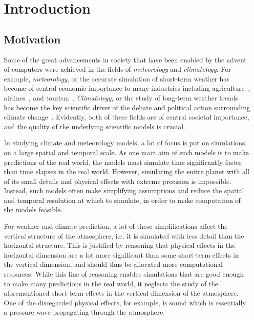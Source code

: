 
\chapter{Introduction}\label{chapter:introduction}
\section{Motivation}\label{sec:motivation}
Some of the great advancements in society that have been enabled by the advent of computers were achieved in the fields of \emph{meteorology} and \emph{climatology}.
For example, \emph{meteorology}, or the accurate simulation of short-term weather has become of central economic importance to many industries including agriculture~\cite{gommes2010guide}, airlines~\cite{sharman2016aviation}, and tourism~\cite{becken2011tourism}.
\emph{Climatology}, or the study of long-term weather trends has become the key scientific driver of the debate and political action surrounding climate change~\cite{carey2012climate}.
Evidently, both of these fields are of central societal importance, and the quality of the underlying scientific models is crucial.


In studying climate and meteorology models, a lot of focus is put on simulations on a large spatial and temporal scale.
As one main aim of such models is to make predictions of the real world, the models must simulate time significantly faster than time elapses in the real world.
However, simulating the entire planet with all of its small details and physical effects with extreme precision is impossible.
Instead, such models often make simplifying assumptions and reduce the spatial and temporal resolution at which to simulate, in order to make computation of the models feasible.

For weather and climate prediction, a lot of these simplifications affect the vertical structure of the atmosphere, i.e. it is simulated with less detail than the horizontal structure.
This is justified by reasoning that physical effects in the horizontal dimension are a lot more significant than some short-term effects in the vertical dimension, and should thus be allocated more computational resources.
While this line of reasoning enables simulations that are good enough to make many predictions in the real world, it neglects the study of the aforementioned short-term effects in the vertical dimension of the atmosphere.
One of the disregarded physical effects, for example, is sound which is essentially a pressure wave propagating through the atmosphere.

